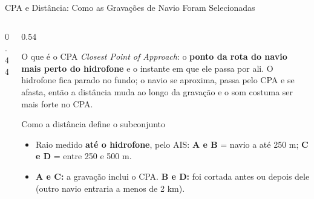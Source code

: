 \documentclass[aspectratio=169]{beamer}
\begin{document}
\begin{frame}{CPA e Distância: Como as Gravações de Navio Foram Selecionadas}
\begin{columns}[T]
\begin{column}{0.44\textwidth}
        \end{column}
        \begin{column}{0.54\textwidth}
            \begin{block}{\small O que é o CPA}
                \scriptsize
                \textit{Closest Point of Approach}: o \textbf{ponto da rota do navio mais perto do hidrofone} e o instante em que ele passa por ali. O hidrofone fica parado no fundo; o navio se aproxima, passa pelo CPA e se afasta, então a distância muda ao longo da gravação e o som costuma ser mais forte no CPA.
            \end{block}
            \begin{block}{\small Como a distância define o subconjunto}
                \scriptsize
                \begin{itemize}
                    \setlength{\itemsep}{1pt}
                    \item Raio medido \textbf{até o hidrofone}, pelo AIS: \textbf{A e B} = navio a até 250 m; \textbf{C e D} = entre 250 e 500 m.
                    \item \textbf{A e C:} a gravação inclui o CPA. \textbf{B e D:} foi cortada antes ou depois dele (outro navio entraria a menos de 2 km).
                \end{itemize}
            \end{block}
        \end{column}
    \end{columns}
\end{frame}
\end{document}
